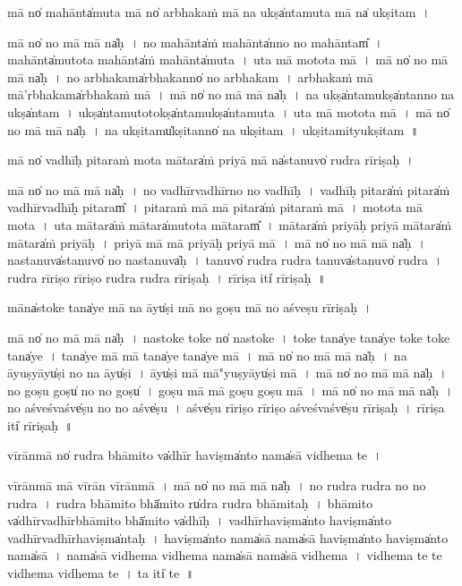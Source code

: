 \documentclass[parskip, DIV=14]{scrartcl}
\begin{document}
{mā no̍ ma॒hānta̍mu॒ta mā no̍ arbha॒kaṁ mā na॒ ukṣa̍ntamu॒ta mā na̍ ukṣi॒tam~।

mā no̍ no॒ mā mā na̍ḥ~।
no॒ ma॒hānta̍ṁ ma॒hānta̍nno  no ma॒hāntam̎~।
ma॒hānta̍mu॒tota ma॒hānta̍ṁ ma॒hānta̍mu॒ta~।
u॒ta mā motota mā~।
mā no̍ no॒ mā mā na̍ḥ~।
no॒ a॒rbha॒kama̍rbha॒kanno̍ no arbha॒kam~।
a॒rbha॒kaṁ mā mā'rbha॒kama̍rbha॒kaṁ mā~।
mā no̍ no॒ mā mā na̍ḥ~।
na॒ ukṣa̍nta॒mukṣa̍ntanno na॒ ukṣa̍ntam~।
ukṣa̍ntamu॒totokṣa̍nta॒mukṣa̍ntamu॒ta~।
u॒ta mā motota mā~।
mā no̍ no॒ mā mā na̍ḥ~।
na॒ u॒kṣi॒tamu̍kṣi॒tanno̍ na ukṣi॒tam~।
u॒kṣi॒tamityukṣi॒tam~॥

mā no̍ vadhīḥ pi॒taraṁ mota mā॒tara̍ṁ pri॒yā mā na̍sta॒nuvo̍ rudra rīriṣaḥ~।

mā no̍ no॒ mā mā na̍ḥ~।
no॒ va॒dhī॒rva॒dhī॒rno॒ no॒ va॒dhī॒ḥ॒~।
va॒dhī॒ḥ pi॒tara̍ṁ pi॒tara̍ṁ vadhīrvadhīḥ pi॒taram̎~।
pi॒tara॒ṁ mā mā pi॒tara̍ṁ pi॒tara॒ṁ mā~।
motota mā mota~।
u॒ta mā॒tara̍ṁ mā॒tara̍mu॒tota mā॒taram̎~।
mā॒tara̍ṁ pri॒yāḥ pri॒yā mā॒tara̍ṁ mā॒tara̍ṁ pri॒yāḥ~।
pri॒yā mā mā pri॒yāḥ pri॒yā mā~।
mā no̍ no॒ mā mā na̍ḥ~।
na॒sta॒nuva̍sta॒nuvo̍ no nasta॒nuva̍ḥ~।
ta॒nuvo̍ rudra rudra ta॒nuva̍sta॒nuvo̍ rudra~।
ru॒dra॒ rī॒ri॒ṣo॒ rī॒ri॒ṣo॒ ru॒dra॒ ru॒dra॒ rī॒ri॒ṣa॒ḥ॒~।
rī॒ri॒ṣa॒ iti̍ rīriṣaḥ~॥

māna̍sto॒ke tana̍ye॒ mā na॒ āyu̍ṣi॒ mā no॒ goṣu॒ mā no॒ aśveṣu rīriṣaḥ~।

mā no̍ no॒ mā mā na̍ḥ~।
na॒sto॒ke to॒ke no̍ nasto॒ke~।
to॒ke tana̍ye॒ tana̍ye to॒ke to॒ke tana̍ye~।
tana̍ye॒ mā mā tana̍ye॒ tana̍ye॒ mā~।
mā no̍ no॒ mā mā na̍ḥ~।
na॒ āyu॒ṣyāyu̍ṣi no na॒ āyu̍ṣi~।
āyu̍ṣi॒ mā mā"yu॒ṣyāyu̍ṣi॒ mā~।
mā no̍ no॒ mā mā na̍ḥ~।
no॒ goṣu॒ goṣu̍ no no॒ goṣu̍~।
goṣu॒ mā mā goṣu॒ goṣu॒ mā~।
mā no̍ no॒ mā mā na̍ḥ~।
no॒ aśve॒śvaśve̍ṣu no no॒ aśve̍ṣu~।
aśve̍ṣu rīriṣo rīriṣo॒ aśve॒śvaśve̍ṣu rīriṣaḥ~।
rī॒ri॒ṣa॒ iti̍ rīriṣaḥ~॥ 

vī॒rānmā no̍ rudra bhāmi॒to va̍dhīr ha॒viṣma̍nto॒ nama̍sā vidhema te~।

vī॒rānmā mā vī॒rān vī॒rānmā~।
mā no̍ no॒ mā mā na̍ḥ~।
no॒ ru॒dra॒ ru॒dra॒ no॒ no॒ ru॒dra॒~।
ru॒dra॒ bhā॒mi॒to bhā̍mi॒to ru̍dra rudra bhāmi॒taḥ~।
bhā॒mi॒to va̍dhīrvadhīrbhāmi॒to bhā̍mi॒to va̍dhīḥ~।
va॒dhī॒rha॒viṣma̍nto ha॒viṣma̍nto vadhīrvadhīrha॒viṣma̍ntaḥ~।
ha॒viṣma̍nto॒ nama̍sā॒ nama̍sā ha॒viṣma̍nto ha॒viṣma̍nto॒ nama̍sā~।
nama̍sā vidhema vidhema॒ nama̍sā॒ nama̍sā vidhema~।
vi॒dhe॒ma॒ te॒ te॒ vi॒dhe॒ma॒ vi॒dhe॒ma॒ te॒~।
ta॒ iti̍ te~॥ 

}
\end{document}
